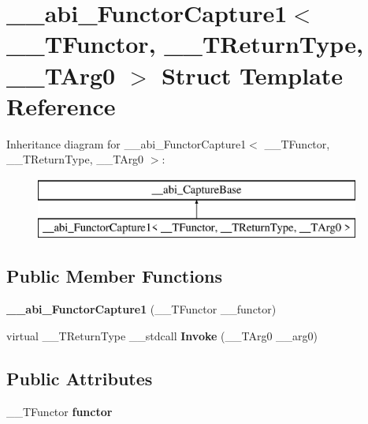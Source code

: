 \hypertarget{struct____abi___functor_capture1}{}\section{\+\_\+\+\_\+abi\+\_\+\+Functor\+Capture1$<$ \+\_\+\+\_\+\+T\+Functor, \+\_\+\+\_\+\+T\+Return\+Type, \+\_\+\+\_\+\+T\+Arg0 $>$ Struct Template Reference}
\label{struct____abi___functor_capture1}
Inheritance diagram for \+\_\+\+\_\+abi\+\_\+\+Functor\+Capture1$<$ \+\_\+\+\_\+\+T\+Functor, \+\_\+\+\_\+\+T\+Return\+Type, \+\_\+\+\_\+\+T\+Arg0 $>$\+:\begin{figure}[H]
\begin{center}
\leavevmode
\includegraphics[height=2.000000cm]{db/d78/struct____abi___functor_capture1}
\end{center}
\end{figure}
\subsection*{Public Member Functions}
\begin{DoxyCompactItemize}
\item 
\mbox{\label{struct____abi___functor_capture1_a8faaf40ffee83d70d27a621b4c0b77bb}} 
{\bfseries \+\_\+\+\_\+abi\+\_\+\+Functor\+Capture1} (\+\_\+\+\_\+\+T\+Functor \+\_\+\+\_\+functor)
\item 
\mbox{\label{struct____abi___functor_capture1_af534da6574e7ffd568125db0605ba5c9}} 
virtual \+\_\+\+\_\+\+T\+Return\+Type \+\_\+\+\_\+stdcall {\bfseries Invoke} (\+\_\+\+\_\+\+T\+Arg0 \+\_\+\+\_\+arg0)
\end{DoxyCompactItemize}
\subsection*{Public Attributes}
\begin{DoxyCompactItemize}
\item 
\mbox{\label{struct____abi___functor_capture1_a6f6a8ab6a633671a7b89ad455687c704}} 
\+\_\+\+\_\+\+T\+Functor {\bfseries functor}
\end{DoxyCompactItemize}
